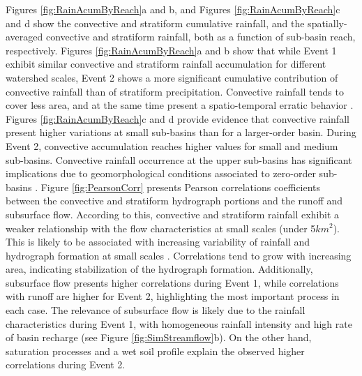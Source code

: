\documentclass[hess, manuscript]{copernicus}
\begin{document}
Figures \ref{fig:RainAcumByReach}a and b, and Figures \ref{fig:RainAcumByReach}c and d show the convective and stratiform cumulative rainfall, and the spatially-averaged convective and stratiform rainfall, both as a function of sub-basin reach, respectively.  Figures \ref{fig:RainAcumByReach}a and b show that while  Event 1 exhibit similar convective and stratiform rainfall accumulation for different watershed scales, Event 2 shows a more significant cumulative contribution of convective rainfall than of stratiform precipitation. Convective rainfall tends to cover less area, and at the same time present a spatio-temporal erratic behavior \citep{Steiner1995, Houze1989}. Figures \ref{fig:RainAcumByReach}c and d provide evidence that convective rainfall present higher variations at small sub-basins than for a larger-order basin. During Event 2, convective accumulation reaches higher values for small and medium sub-basins.   Convective rainfall occurrence at the upper sub-basins has significant implications due to geomorphological conditions associated to zero-order sub-basins \citep{Sidle2018}. Figure \ref{fig:PearsonCorr} presents Pearson correlations coefficients between the convective and stratiform hydrograph portions and the runoff and subsurface flow. According to this, convective and stratiform rainfall exhibit a weaker relationship with the flow characteristics at small scales (under 5$km^2$).  This is likely to be associated with increasing variability of rainfall and hydrograph formation at small scales \citep{Ayalew2014}.  Correlations tend to grow with increasing  area, indicating stabilization of the hydrograph formation. Additionally,  subsurface flow presents higher correlations during Event 1, while correlations with runoff are higher for Event 2, highlighting the most important process in each case.  The relevance of subsurface flow is likely due to the rainfall characteristics during  Event 1, with homogeneous rainfall intensity and high rate of basin recharge (see Figure \ref{fig:SimStreamflow}b).  On the other hand, saturation processes and a wet soil profile explain the observed higher correlations during Event 2. \\
\end{document}
